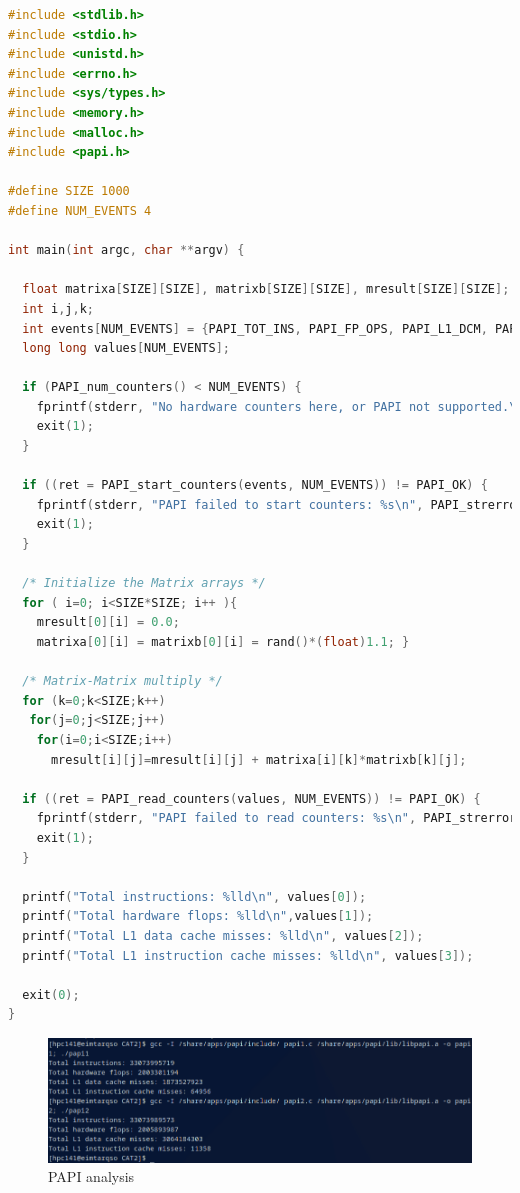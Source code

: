 \documentclass[11pt]{article}
\begin{document}
\begin{lstlisting}[language=C, caption=papi2.c from counters2.c]
#include <stdlib.h>
#include <stdio.h>
#include <unistd.h>
#include <errno.h>
#include <sys/types.h>
#include <memory.h>
#include <malloc.h>
#include <papi.h>

#define SIZE 1000
#define NUM_EVENTS 4

int main(int argc, char **argv) {

  float matrixa[SIZE][SIZE], matrixb[SIZE][SIZE], mresult[SIZE][SIZE];
  int i,j,k;
  int events[NUM_EVENTS] = {PAPI_TOT_INS, PAPI_FP_OPS, PAPI_L1_DCM, PAPI_L1_ICM}, ret;
  long long values[NUM_EVENTS];

  if (PAPI_num_counters() < NUM_EVENTS) {
  	fprintf(stderr, "No hardware counters here, or PAPI not supported.\n");
  	exit(1);
  }

  if ((ret = PAPI_start_counters(events, NUM_EVENTS)) != PAPI_OK) {
  	fprintf(stderr, "PAPI failed to start counters: %s\n", PAPI_strerror(ret));
  	exit(1);
  }

  /* Initialize the Matrix arrays */
  for ( i=0; i<SIZE*SIZE; i++ ){
    mresult[0][i] = 0.0;
    matrixa[0][i] = matrixb[0][i] = rand()*(float)1.1; }

  /* Matrix-Matrix multiply */
  for (k=0;k<SIZE;k++)
   for(j=0;j<SIZE;j++)
    for(i=0;i<SIZE;i++)
      mresult[i][j]=mresult[i][j] + matrixa[i][k]*matrixb[k][j];

  if ((ret = PAPI_read_counters(values, NUM_EVENTS)) != PAPI_OK) {
  	fprintf(stderr, "PAPI failed to read counters: %s\n", PAPI_strerror(ret));
  	exit(1);
  }

  printf("Total instructions: %lld\n", values[0]);
  printf("Total hardware flops: %lld\n",values[1]);
  printf("Total L1 data cache misses: %lld\n", values[2]);
  printf("Total L1 instruction cache misses: %lld\n", values[3]);

  exit(0);
}

\end{lstlisting}

\begin{figure}[h!]
    \centering
    \includegraphics{papi.png}
    \caption{PAPI analysis}
    \label{fig:papi}
\end{figure}
\end{document}
